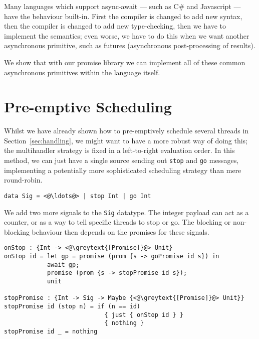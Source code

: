 \documentclass[msc,deptreport,cs]{infthesis} %
\newcommand{\code}[1]{\lstinline{#1}}
\newcommand{\greytext}[1]{\textcolor{black!40}{#1}}
\begin{document}
Many languages which support async-await --- such as C# and Javascript --- have
the behaviour built-in. First the compiler is changed to add new syntax, then
the compiler is changed to add new type-checking, then we have to implement the
semantics; even worse, we have to do this when we want another asynchronous
primitive, such as futures (asynchronous post-processing of results).

We show that with our promise library we can implement all of these common
asynchronous primitives within the language itself.

\section{Pre-emptive Scheduling}
\label{sec:pre-emptive-scheduling}



Whilst we have already shown how to pre-emptively schedule several threads in
Section~\ref{sec:handling}, we might want to have a more robust way of doing
this; the multihandler strategy is fixed in a left-to-right evaluation order. In
this method, we can just have a single source sending out \code{stop} and
\code{go} messages, implementing a potentially more sophisticated scheduling
strategy than mere round-robin.

\begin{lstlisting}
data Sig = <@\ldots@> | stop Int | go Int
\end{lstlisting}

We add two more signals to the \code{Sig} datatype. The integer payload can act
as a counter, or as a way to tell specific threads to stop or go. The blocking
or non-blocking behaviour then depends on the promises for these signals.

\begin{lstlisting}
onStop : {Int -> <@\greytext{[Promise]}@> Unit}
onStop id = let gp = promise (prom {s -> goPromise id s}) in
            await gp;
            promise (prom {s -> stopPromise id s});
            unit

stopPromise : {Int -> Sig -> Maybe {<@\greytext{[Promise]}@> Unit}}
stopPromise id (stop n) = if (n == id)
                            { just { onStop id } }
                            { nothing }
stopPromise id _ = nothing
\end{lstlisting}
\end{document}
